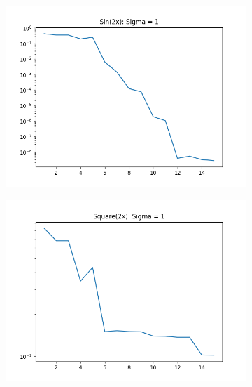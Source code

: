 \documentclass{article}
\begin{document}
\begin{figure}[ht!]
\begin{subfigure}[t]{0.4\textwidth}
        \includegraphics[width=1\textwidth]{plots/batch/batch_error_sin2x_log.png}
        \caption{}
    \end{subfigure}
        \begin{subfigure}[t]{0.4\textwidth}
        \includegraphics[width=1\textwidth]{plots/batch/batch_error_square2x_log.png}
        \caption{}
    \end{subfigure}
    \begin{subfigure}[t]{0.4\textwidth}
        \centering

\end{subfigure}
\end{figure}
\end{document}
